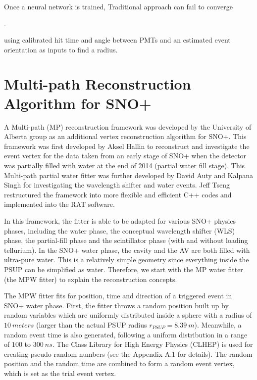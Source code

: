Once a neural network is trained, Traditional approach can fail to converge


\cite{markNeuralNetwork,markNeuralTalk}.


using calibrated hit time
 and angle between PMTs and an estimated event orientation as inputs to find
a radius.


\section{Multi-path Reconstruction Algorithm for SNO+}\label{sect:mpw}
A Multi-path (MP) reconstruction framework was developed by the University of Alberta group as an additional vertex reconstruction algorithm for SNO+.
This framework was first developed by Aksel Hallin to reconstruct and investigate the event vertex for the data taken from an early stage of SNO+ when the detector was partially filled with water at the end of 2014 (partial water fill stage)\cite{partialWater}. This Multi-path partial water fitter was further developed by David Auty and Kalpana Singh for investigating the wavelength shifter and water events\cite{davidPartialWater, kalpanaWLS, kalpanaWLS2, kalpanaMPFitter}. Jeff Tseng restructured the framework into more flexible and efficient C++ codes and implemented into the RAT software\cite{jieMPW}.

In this framework, the fitter is able to be adapted for various SNO+ physics phases, including the water phase, the conceptual wavelength shifter (WLS) phase, the partial-fill phase and the scintillator phase (with and without loading tellurium). In the SNO+ water phase, the cavity and the AV are both filled with ultra-pure water. This is a relatively simple geometry since everything inside the PSUP can be simplified as water. Therefore, we start with the MP water fitter (the MPW fitter) to explain the reconstruction concepts.

The MPW fitter fits for position, time and direction of a triggered event in SNO+ water phase. First, the fitter throws a random position built up by random variables which are uniformly distributed inside a sphere with a radius of $10~meters$ (larger than the actual PSUP radius $r_{PSUP}=8.39~m$). Meanwhile, a random event time is also generated, following a uniform distribution in a range of $100$ to $300~ns$. The Class Library for High Energy Physics (CLHEP) is used for creating pseudo-random numbers (see the Appendix A.1 for details). The random position and the random time are combined to form a random event vertex, which is set as the trial event vertex.

